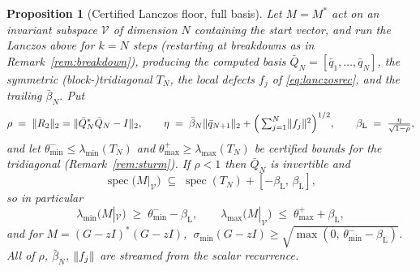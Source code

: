 \documentclass[11pt]{article}
\newtheorem{proposition}[theorem]{Proposition}
\newcommand{\spec}{\operatorname{spec}}
\newcommand{\sigmin}{\sigma_{\min}}
\DeclarePairedDelimiter{\norm}{\lVert}{\rVert}
\begin{document}
\begin{proposition}[Certified Lanczos floor, full basis]\label{prop:lanczosfloor}
Let $M=M^*$ act on an invariant subspace $\mathcal V$ of dimension $N$ containing the start vector, and
run the Lanczos above for $k=N$ steps (restarting at breakdowns as in Remark~\ref{rem:breakdown}),
producing the computed basis $\bar Q_N=[\bar q_1,\dots,\bar q_N]$, the symmetric (block-)tridiagonal
$T_N$, the local defects $f_j$ of \eqref{eq:lanczosrec}, and the trailing $\bar\beta_N$. Put
\[
  \rho\;=\;\norm{R_2}_2=\norm{\bar Q_N^*\bar Q_N-I}_2,\qquad
  \eta\;=\;\bar\beta_N\norm{\bar q_{N+1}}_2+\Big(\textstyle\sum_{j=1}^N\norm{f_j}^2\Big)^{1/2},\qquad
  \beta_{\mathrm L}\;=\;\frac{\eta}{\sqrt{1-\rho}} ,
\]
and let $\theta_{\min}^-\le\lambda_{\min}(T_N)$ and $\theta_{\max}^+\ge\lambda_{\max}(T_N)$ be certified
bounds for the tridiagonal (Remark~\ref{rem:sturm}). If $\rho<1$ then $\bar Q_N$ is invertible and
\[
  \spec\!\big(M|_{\mathcal V}\big)\;\subseteq\;\spec(T_N)+[-\beta_{\mathrm L},\,\beta_{\mathrm L}],
\]
so in particular
\[
  \lambda_{\min}\!\big(M|_{\mathcal V}\big)\;\ge\;\theta_{\min}^--\beta_{\mathrm L},
  \qquad
  \lambda_{\max}\!\big(M|_{\mathcal V}\big)\;\le\;\theta_{\max}^++\beta_{\mathrm L},
\]
and for $M=(G-zI)^*(G-zI)$, $\ \sigmin(G-zI)\ge\sqrt{\max(0,\,\theta_{\min}^--\beta_{\mathrm L})}$.
All of $\rho$, $\bar\beta_N$, $\norm{f_j}$ are streamed from the scalar recurrence.
\end{proposition}
\end{document}
